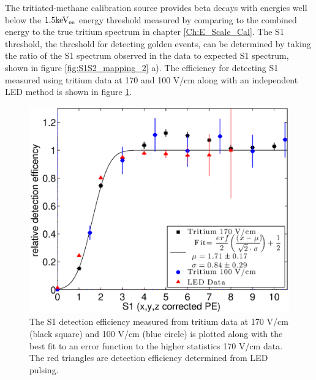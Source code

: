 The tritiated-methane calibration source provides beta decays with energies well below the $\rm 1.5 keV_{ee}$ energy threshold measured by comparing to the combined energy to the true tritium spectrum in chapter \ref{Ch:E_Scale_Cal}. The S1 threshold, the threshold for detecting golden events, can be determined by taking the ratio of the S1 spectrum observed in the data to expected S1 spectrum, shown in figure \ref{fig:S1S2_mapping_2} a). The efficiency for detecting S1 measured using tritium data at 170 and 100 V/cm along with an independent LED method is shown in figure \ref{fig:S1_Thresh}. 

\renewcommand{\baselinestretch}{1}
\small\normalsize
\begin{figure}[h!]\centering
\includegraphics[width=120mm]{Chapter_T/Figures/Threshold/S1_thresh_iter1_led.eps}
\caption{The S1 detection efficiency measured from tritium data at 170 V/cm (black square) and 100 V/cm (blue circle) is plotted along with the best fit to an error function to the higher statistics 170 V/cm data. The red triangles are detection efficiency determined from LED pulsing. }
\label{fig:S1_Thresh}
\end{figure}
\renewcommand{\baselinestretch}{2}
\small\normalsize

